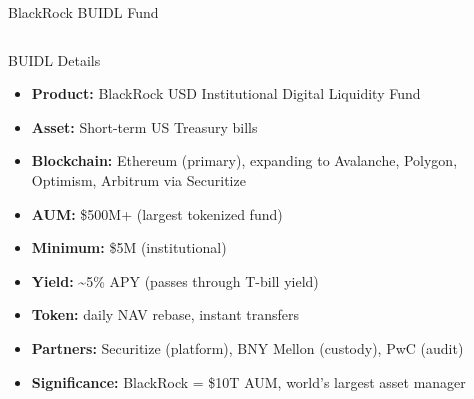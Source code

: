 \documentclass[8pt,aspectratio=169]{beamer}
\begin{document}
\begin{frame}{BlackRock BUIDL Fund}
\begin{columns}[T]
\vspace{2mm}
\footnotesize
\begin{block}{BUIDL Details}
\begin{itemize}
  \item \textbf{Product:} BlackRock USD Institutional Digital Liquidity Fund
  \item \textbf{Asset:} Short-term US Treasury bills
  \item \textbf{Blockchain:} Ethereum (primary), expanding to Avalanche, Polygon, Optimism, Arbitrum via Securitize
  \item \textbf{AUM:} \$500M+ (largest tokenized fund)
  \item \textbf{Minimum:} \$5M (institutional)
  \item \textbf{Yield:} \textasciitilde5\% APY (passes through T-bill yield)
  \item \textbf{Token:} daily NAV rebase, instant transfers
  \item \textbf{Partners:} Securitize (platform), BNY Mellon (custody), PwC (audit)
  \item \textbf{Significance:} BlackRock = \$10T AUM, world's largest asset manager
\end{itemize}
\end{block}


\end{columns}
\end{frame}
\end{document}
